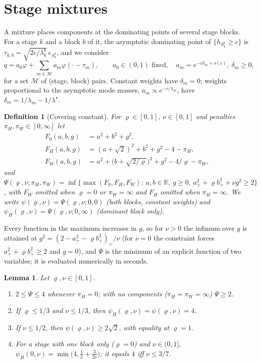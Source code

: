 \documentclass[pdflatex,sn-mathphys-ay]{sn-jnl}%
\theoremstyle{thmstyleone}%
\newtheorem{lemma}{Lemma}
\theoremstyle{thmstylethree}%
\newtheorem{definition}{Definition}
\theoremstyle{thmstyletwo}%
\newcommand{\R}{\mathbb{R}}
\begin{document}
\section{Stage mixtures}
\label{sec:mixture}

A mixture places components at the dominating points of several stage blocks. For a
stage $k$ and a block $b$ of it, the asymptotic dominating point of $\{h_{S^b_k}\ge c\}$
is $\tau_{k,b}=\sqrt{2c/\lambda^b_k}\,e_{S^b_k}$, and we consider
\[
q=a_0\varphi+\sum_{m\in\mathcal M}a_m\varphi(\cdot-\tau_m),\qquad
a_0\in(0,1)\text{ fixed},\quad a_m=e^{-c\delta_m+o(c)},\ \delta_m\ge0,
\]
for a set $\mathcal M$ of (stage, block) pairs. Constant weights have $\delta_m=0$; weights
proportional to the asymptotic mode masses, $a_m\propto e^{-c/\lambda_m}$, have
$\delta_m=1/\lambda_m-1/\lambda^\star$.

\begin{definition}[Covering constant]\label{def:psi}
For $\varrho\in[0,1]$, $\nu\in[0,1]$ and penalties $\pi_H,\pi_W\in[0,\infty]$ let
\begin{align*}
F_0(a,b,g)&=a^2+b^2+g^2,\\
F_H(a,b,g)&=(a+\sqrt2)^2+b^2+g^2-4-\pi_H,\\
F_W(a,b,g)&=a^2+\big(b+\sqrt{2/\varrho}\big)^2+g^2-4/\varrho-\pi_W,
\end{align*}
and
$\Psi(\varrho,\nu;\pi_H,\pi_W)=\inf\{\max(F_0,F_H,F_W):\ a,b\in\R,\ g\ge0,\
a_+^2+\varrho b_+^2+\nu g^2\ge2\}$,
with $F_W$ omitted when $\varrho=0$ or $\pi_W=\infty$ and $F_H$ omitted when
$\pi_H=\infty$. We write $\psi(\varrho,\nu)=\Psi(\varrho,\nu;0,0)$ (both blocks, constant
weights) and $\psi_H(\varrho,\nu)=\Psi(\varrho,\nu;0,\infty)$ (dominant block only).
\end{definition}

Every function in the maximum increases in $g$, so for $\nu>0$ the infimum over $g$ is
attained at $g^2=(2-a_+^2-\varrho b_+^2)_+/\nu$ (for $\nu=0$ the constraint forces
$a_+^2+\varrho b_+^2\ge2$ and $g=0$), and $\Psi$ is the minimum of an explicit function of
two variables; it is evaluated numerically in seconds.

\begin{lemma}\label{lem:psi}
Let $\varrho,\nu\in[0,1]$.
\begin{enumerate}
\item[(a)] $2\le\Psi\le4$ whenever $\pi_H=0$; with no components ($\pi_H=\pi_W=\infty$)
$\Psi\ge2$.
\item[(b)] If $\varrho\le1/3$ and $\nu\le1/3$, then $\psi_H(\varrho,\nu)=\psi(\varrho,\nu)=4$.
\item[(c)] If $\nu\le1/2$, then $\psi(\varrho,\nu)\ge2\sqrt2$, with equality at $\varrho=1$.
\item[(d)] For a stage with one block only ($\varrho=0$) and $\nu\in(0,1]$,
$\psi_H(0,\nu)=\min\big(4,\tfrac12+\tfrac3{2\nu}\big)$; it equals $4$ iff $\nu\le3/7$.
\end{enumerate}
\end{lemma}
\end{document}
